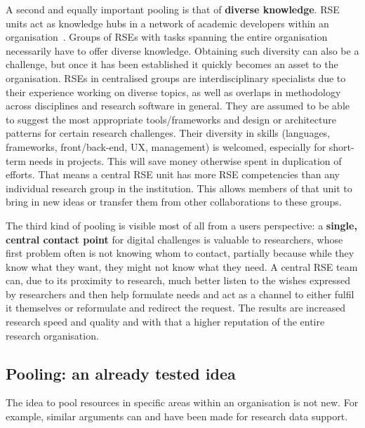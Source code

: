 \documentclass[a4paper]{article}
\begin{document}
A second and equally important pooling is that of \textbf{diverse knowledge}.
RSE units act as knowledge hubs in a network of academic developers within an organisation~\autocite{Elsholz2006}.
Groups of RSEs with tasks spanning the entire organisation necessarily have to offer diverse knowledge.
Obtaining such diversity can also be a challenge, but once it has been established it quickly becomes an asset to the organisation.
RSEs in centralised groups are interdisciplinary specialists due to their experience working on diverse topics,  as well as overlaps in methodology across disciplines and research software in general.
They are assumed to be able to suggest the most appropriate tools/frameworks and design or architecture patterns for certain research challenges.
Their diversity in skills (languages, frameworks, front/back-end, UX, management) is welcomed, especially for short-term needs in projects.
This will save money otherwise spent in duplication of efforts.
That means a central RSE unit has more RSE competencies than any individual research group in the institution.
This allows members of that unit to bring in new ideas or transfer them from other collaborations to these groups.

The third kind of pooling is visible most of all from a users perspective: a \textbf{single, central contact point} for digital challenges is valuable to researchers, whose first problem often is not knowing whom to contact, partially because while they know what they want, they might not know what they need.
A central RSE team can, due to its proximity to research, much better listen to the wishes expressed by researchers and then help formulate needs and act as a channel to either fulfil it themselves or reformulate and redirect the request.
The results are increased research speed and quality and with that a higher reputation of the entire research organisation.

\subsection{Pooling: an already tested idea}
The idea to pool resources in specific areas within an organisation is not new.
For example, similar arguments can and have been made for research data support.
\end{document}
